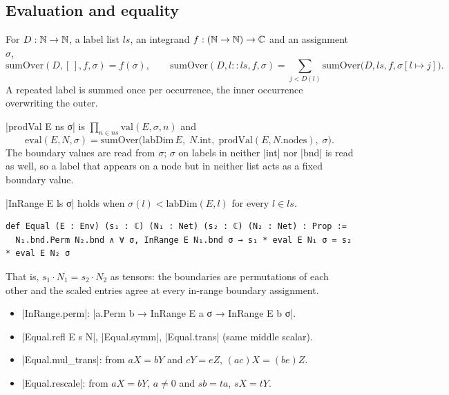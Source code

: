 \subsection{Evaluation and equality}\label{sec:lean-core-net-eval}

\begin{definition}
For $D:\mathbb{N}\to\mathbb{N}$, a label list $ls$, an integrand $f:(\mathbb{N}\to\mathbb{N})\to\mathbb{C}$ and an assignment $\sigma$,
\[
  \mathrm{sumOver}(D,[\,],f,\sigma)=f(\sigma),\qquad
  \mathrm{sumOver}(D,l{::}ls,f,\sigma)=\sum_{j<D(l)}\mathrm{sumOver}\bigl(D,ls,f,\sigma[l\mapsto j]\bigr).
\]
A repeated label is summed once per occurrence, the inner occurrence overwriting the outer.
\end{definition}

\begin{definition}[Evaluation]\label{def:lean-core-eval}
\lean|prodVal E ns σ| is $\prod_{n\in ns}\mathrm{val}(E,\sigma,n)$ and
\[
  \mathrm{eval}(E,N,\sigma)=\mathrm{sumOver}\bigl(\mathrm{labDim}\,E,\;N.\mathrm{int},\;
  \mathrm{prodVal}(E,N.\mathrm{nodes}),\;\sigma\bigr).
\]
The boundary values are read from $\sigma$; $\sigma$ on labels in neither \lean|int| nor
\lean|bnd| is read as well, so a label that appears on a node but in neither list acts as a fixed
boundary value.
\end{definition}

\begin{definition}\label{def:lean-core-equal}
\lean|InRange E ls σ| holds when $\sigma(l)<\mathrm{labDim}(E,l)$ for every $l\in ls$.
\begin{lstlisting}[style=leancore]
def Equal (E : Env) (s₁ : ℂ) (N₁ : Net) (s₂ : ℂ) (N₂ : Net) : Prop :=
  N₁.bnd.Perm N₂.bnd ∧ ∀ σ, InRange E N₁.bnd σ → s₁ * eval E N₁ σ = s₂ * eval E N₂ σ
\end{lstlisting}
That is, $s_1\cdot N_1=s_2\cdot N_2$ as tensors: the boundaries are permutations of each other and
the scaled entries agree at every in-range boundary assignment.
\end{definition}

\begin{lemma}
\begin{itemize}
\item \lean|InRange.perm|: \lean|a.Perm b → InRange E a σ → InRange E b σ|.
\item \lean|Equal.refl E s N|, \lean|Equal.symm|, \lean|Equal.trans| (same middle scalar).
\item \lean|Equal.mul_trans|: from $a X=bY$ and $cY=eZ$, $(ac)X=(be)Z$.
\item \lean|Equal.rescale|: from $aX=bY$, $a\ne0$ and $sb=ta$, $sX=tY$.
\end{itemize}
\end{lemma}

